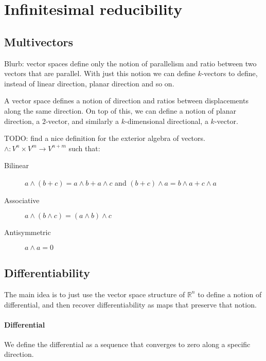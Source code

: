 \documentclass[11pt,letterpaper,fleqn]{memoir}
\begin{document}
	
\tableofcontents* 
	
\cleardoublepage 
\mainmatter

\chapter{Infinitesimal reducibility}

\section{Multivectors}

Blurb: vector spaces define only the notion of parallelism and ratio between two vectors that are parallel. With just this notion we can define $k$-vectors to define, instead of linear direction, planar direction and so on.

A vector space defines a notion of direction and ratios between displacements along the same direction. On top of this, we can define a notion of planar direction, a $2$-vector, and similarly a $k$-dimensional directional, a $k$-vector.

\begin{defn}
	TODO: find a nice definition for the exterior algebra of vectors.
	$\wedge : V^n \times V^m \to V^{n+m}$ such that:
	\begin{description}
	\item[Bilinear] $a \wedge(b + c) = a \wedge b + a \wedge c$ and $(b + c) \wedge a= b \wedge a + c \wedge a$
	\item[Associative] $a \wedge (b \wedge c) = (a \wedge b) \wedge c$
	\item[Antisymmetric] $a \wedge a = 0$
	\end{description}
	
\end{defn}

\section{Differentiability}

The main idea is to just use the vector space structure of $\mathbb{R}^n$ to define a notion of differential, and then recover differentiability as maps that preserve that notion.

\subsubsection{Differential}

We define the differential as a sequence that converges to zero along a specific direction.
\end{document}
